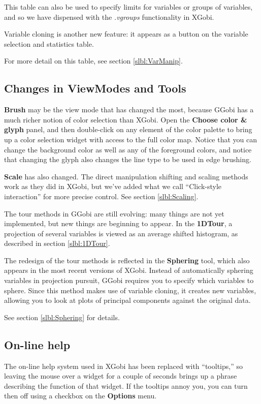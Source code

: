 \documentclass[11pt]{article}
\begin{document}
This table can also be used to specify limits for variables or groups
of variables, and so we have dispensed with the {\em .vgroups}
functionality in XGobi.

Variable cloning is another new feature: it appears as a button
on the variable selection and statistics table.

For more detail on this table, see section \ref{slbl:VarManip}.

\subsection{Changes in ViewModes and Tools}

{\bf Brush} may be the view mode that has changed the most,
because GGobi has a much richer notion of color selection than
XGobi.  Open the {\bf Choose color \& glyph} panel, and then
double-click on any element of the color palette to bring up a color
selection widget with access to the full color map.  Notice that you
can change the background color as well as any of the foreground
colors, and notice that changing the glyph also changes the line
type to be used in edge brushing.

{\bf Scale} has also changed.  The direct manipulation shifting and
scaling methods work as they did in XGobi, but we've added what we
call ``Click-style interaction'' for more precise control.  See section
\ref{slbl:Scaling}.

The tour methods in GGobi are still evolving: many things are not yet
implemented, but new things are beginning to appear.  In the {\bf
1DTour}, a projection of several variables is viewed as an average
shifted histogram, as described in section \ref{slbl:1DTour}.

The redesign of the tour methods is reflected in the {\bf Sphering}
tool, which also appears in the most recent versions of XGobi.
Instead of automatically sphering variables in projection pursuit,
GGobi requires you to specify which variables to sphere.  Since this
method makes use of variable cloning, it creates new variables,
allowing you to look at plots of principal components against the
original data.

See section \ref{slbl:Sphering} for details.

\subsection{On-line help}

The on-line help system used in XGobi has been replaced with
``tooltips,'' so leaving the mouse over a widget for a couple of
seconds brings up a phrase describing the function of that widget.
If the tooltips annoy you, you can turn then off using a checkbox on
the {\bf Options} menu.
\end{document}
